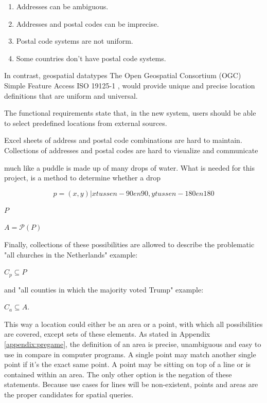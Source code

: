 \begin{enumerate}
	\item Addresses can be ambiguous.
	\item Addresses and postal codes can be imprecise.
	\item Postal code systems are not uniform.
	\item Some countries don't have postal code systems.
\end{enumerate}

In contrast, geospatial datatypes The Open Geospatial Consortium (OGC) Simple Feature Access ISO 19125-1 \cite{SFA}, would provide unique and precise location definitions that are uniform and universal.


The functional requirements state that, in the new system, users should be able to select predefined locations from external sources.

Excel sheets of address and postal code combinations are hard to maintain.
Collections of addresses and postal codes are hard to visualize and communicate


much like a puddle is made up of many drops of water. What is needed for this project, is a method to determine whether a drop



\[p = {(x, y) | x tussen -90 en 90, y tussen -180 en 180 }\]

$P$

$A = \mathcal{P}(P)$

Finally, collections of these possibilities are allowed to describe the problematic "all churches in the Netherlands" example:

$C_p \subseteq P$

and "all counties in which the majority voted Trump" example:

$C_a \subseteq A$.

This way a location could either be an area or a point, with which all possibilities are covered, except sets of these elements. As stated in Appendix \ref{appendix:pregame}, the definition of an area is precise, unambiguous and easy to use in compare in computer programs. A single point may match another single point if it’s the exact same point. A point may be sitting on top of a line or is contained within an area. The only other option is the negation of these statements. Because use cases for lines will be non-existent, points and areas are the proper candidates for spatial queries.

